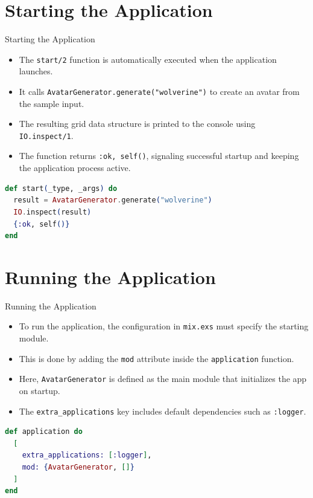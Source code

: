 \documentclass[aspectratio=169, table]{beamer}
\begin{document}
\section{Starting the Application}
\begin{frame}[fragile]{Starting the Application}
\small
\begin{itemize}
  \item The \texttt{start/2} function is automatically executed when the application launches.
  \item It calls \texttt{AvatarGenerator.generate("wolverine")} to create an avatar from the sample input.
  \item The resulting grid data structure is printed to the console using \texttt{IO.inspect/1}.
  \item The function returns \texttt{{:ok, self()}}, signaling successful startup and keeping the application process active.
\end{itemize}

\begin{lstlisting}[language=Elixir, basicstyle=\ttfamily\small]
def start(_type, _args) do
  result = AvatarGenerator.generate("wolverine")
  IO.inspect(result)
  {:ok, self()}
end
\end{lstlisting}
\end{frame}

\section{Running the Application}
\begin{frame}[fragile]{Running the Application}
\small
\begin{itemize}
  \item To run the application, the configuration in \texttt{mix.exs} must specify the starting module.
  \item This is done by adding the \texttt{mod} attribute inside the \texttt{application} function.
  \item Here, \texttt{AvatarGenerator} is defined as the main module that initializes the app on startup.
  \item The \texttt{extra\_applications} key includes default dependencies such as \texttt{:logger}.
\end{itemize}

\begin{lstlisting}[language=Elixir, basicstyle=\ttfamily\small]
def application do
  [
    extra_applications: [:logger],
    mod: {AvatarGenerator, []}
  ]
end
\end{lstlisting}
\end{frame}
\end{document}
